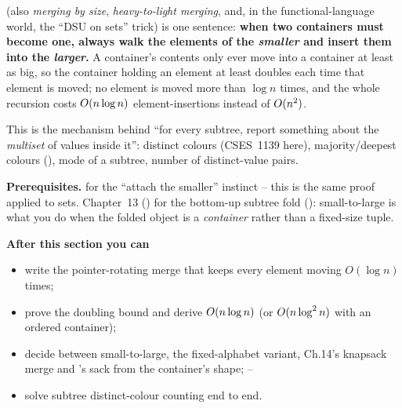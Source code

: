 \begin{topicintro}
 (also \emph{merging by size}, \emph{heavy-to-light
merging}, and, in the functional-language world, the ``DSU on sets'' trick) is
one sentence: \textbf{when two containers must become one, always walk the
elements of the \emph{smaller} and insert them into the \emph{larger}.}  A
container's contents only ever move into a container at least as big, so the
container holding an element at least doubles each time that element is moved;
no element is moved more than \(\log n\) times, and the whole recursion costs
\(O(n\log n)\) element-insertions instead of \(O(n^2)\).

This is the mechanism behind ``for every subtree, report something about the
\emph{multiset} of values inside it'': distinct colours (CSES~1139 here),
majority/deepest colours (), mode of a subtree, number of
distinct-value pairs.

\textbf{Prerequisites.}  for the ``attach the smaller''
instinct -- this is the same proof applied to sets.  Chapter~13
() for the bottom-up subtree fold ():
small-to-large is what you do when the folded object is a \emph{container}
rather than a fixed-size tuple.

\textbf{After this section you can}
\begin{itemize}[nosep]
  \item write the pointer-rotating merge that keeps every element moving
        \(O(\log n)\) times; \hfill{}
  \item prove the doubling bound and derive \(O(n\log n)\) (or
        \(O(n\log^2 n)\) with an ordered container); \hfill{}
  \item decide between small-to-large, the fixed-alphabet variant, Ch.14's
        knapsack merge and 's sack from the container's
        shape; \hfill{}--
  \item solve subtree distinct-colour counting end to end. \hfill{}
\end{itemize}
\end{topicintro}

